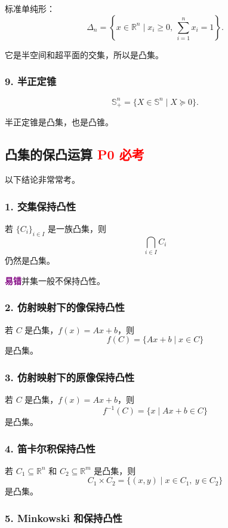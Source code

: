 \documentclass[11pt,a4paper]{ctexart}
\newcommand{\R}{\mathbb{R}}
\newcommand{\Ssym}{\mathbb{S}}
\newcommand{\Snplus}{\mathbb{S}_+^n}
\newcommand{\Pzero}{\textcolor{red}{\textbf{P0 必考}}}
\newcommand{\warn}{\textcolor{purple}{\textbf{易错}}}
\theoremstyle{definition}
\theoremstyle{plain}
\theoremstyle{remark}
\begin{document}
标准单纯形：
\[
    \Delta_n=
    \left\{
    x\in\R^n
    \mid
    x_i\ge0,\ \sum_{i=1}^n x_i=1
    \right\}.
\]

它是半空间和超平面的交集，所以是凸集。

\subsubsection*{9. 半正定锥}

\[
    \Snplus
    =
    \{X\in\Ssym^n\mid X\succeq0\}.
\]

半正定锥是凸集，也是凸锥。

\subsection{凸集的保凸运算 \Pzero}

以下结论非常常考。

\subsubsection*{1. 交集保持凸性}

若 $\{C_i\}_{i\in I}$ 是一族凸集，则
\[
    \bigcap_{i\in I} C_i
\]
仍然是凸集。

\warn{并集一般不保持凸性。}

\subsubsection*{2. 仿射映射下的像保持凸性}

若 $C$ 是凸集，$f(x)=Ax+b$，则
\[
    f(C)=\{Ax+b\mid x\in C\}
\]
是凸集。

\subsubsection*{3. 仿射映射下的原像保持凸性}

若 $C$ 是凸集，$f(x)=Ax+b$，则
\[
    f^{-1}(C)=\{x\mid Ax+b\in C\}
\]
是凸集。

\subsubsection*{4. 笛卡尔积保持凸性}

若 $C_1\subseteq\R^n$ 和 $C_2\subseteq\R^m$ 是凸集，则
\[
    C_1\times C_2
    =
    \{(x,y)\mid x\in C_1,\ y\in C_2\}
\]
是凸集。

\subsubsection*{5. Minkowski 和保持凸性}
\end{document}
